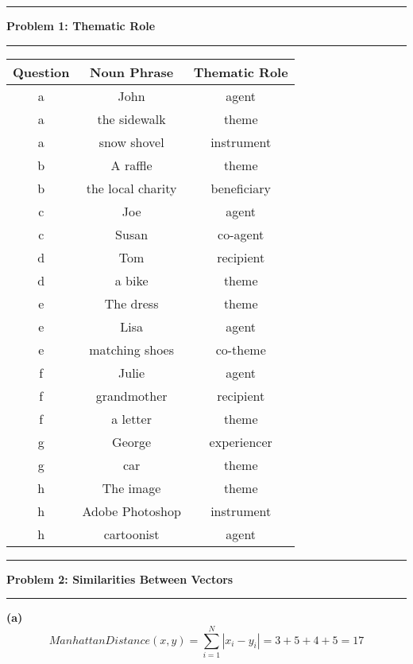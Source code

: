 \documentclass[11pt]{article}
\newcommand\question[2]{\vspace{.25in}\hrule\textbf{#1: #2}\vspace{.5em}\hrule\vspace{.10in}}
\renewcommand\part[1]{\vspace{.10in}\textbf{(#1)}}
\begin{document}
\raggedright

\newcommand\NAME{Jake Pitkin}
\newcommand\UID{u0891770}
\newcommand\HWNUM{3}

\question{Problem 1}{Thematic Role}

 \begin{table}[H]
\centering
{\renewcommand{\arraystretch}{1.2}%
\begin{tabular}{| c | c | c |}
\hline
\textbf{Question} & \textbf{Noun Phrase} & \textbf{Thematic Role}\\
\hline
a & John & agent\\ \hline
a & the sidewalk & theme\\ \hline
a & snow shovel & instrument\\ \hline
b & A raffle & theme\\ \hline
b & the local charity & beneficiary\\ \hline
c & Joe & agent\\ \hline
c & Susan & co-agent\\ \hline
d & Tom & recipient\\ \hline
d & a bike & theme\\ \hline
e & The dress & theme\\ \hline
e & Lisa & agent\\ \hline
e & matching shoes & co-theme\\ \hline
f & Julie & agent\\ \hline
f & grandmother & recipient\\ \hline
f & a letter & theme\\ \hline
g & George & experiencer\\ \hline
g & car & theme\\ \hline
h & The image & theme\\ \hline
h & Adobe Photoshop & instrument\\ \hline
h & cartoonist & agent\\ \hline
\end{tabular}}
\end{table}

\question{Problem 2}{Similarities Between Vectors}

\part{a}
$$ManhattanDistance(x, y) = \sum_{i = 1}^N |x_i - y_i| = 3 + 5 + 4 + 5 = 17$$

\end{document}
